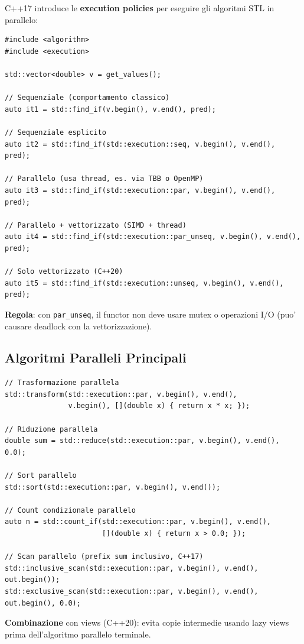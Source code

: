 \documentclass[11pt,a4paper]{article}
\theoremstyle{remark}
\begin{document}
C++17 introduce le \textbf{execution policies} per eseguire gli algoritmi STL in parallelo:

\begin{lstlisting}[style=cpp]
#include <algorithm>
#include <execution>

std::vector<double> v = get_values();

// Sequenziale (comportamento classico)
auto it1 = std::find_if(v.begin(), v.end(), pred);

// Sequenziale esplicito
auto it2 = std::find_if(std::execution::seq, v.begin(), v.end(), pred);

// Parallelo (usa thread, es. via TBB o OpenMP)
auto it3 = std::find_if(std::execution::par, v.begin(), v.end(), pred);

// Parallelo + vettorizzato (SIMD + thread)
auto it4 = std::find_if(std::execution::par_unseq, v.begin(), v.end(), pred);

// Solo vettorizzato (C++20)
auto it5 = std::find_if(std::execution::unseq, v.begin(), v.end(), pred);
\end{lstlisting}

\textbf{Regola}: con \lstinline|par_unseq|, il functor non deve usare mutex o operazioni I/O (puo' causare deadlock con la vettorizzazione).

\subsection{Algoritmi Paralleli Principali}

\begin{lstlisting}[style=cpp]
// Trasformazione parallela
std::transform(std::execution::par, v.begin(), v.end(),
               v.begin(), [](double x) { return x * x; });

// Riduzione parallela
double sum = std::reduce(std::execution::par, v.begin(), v.end(), 0.0);

// Sort parallelo
std::sort(std::execution::par, v.begin(), v.end());

// Count condizionale parallelo
auto n = std::count_if(std::execution::par, v.begin(), v.end(),
                       [](double x) { return x > 0.0; });

// Scan parallelo (prefix sum inclusivo, C++17)
std::inclusive_scan(std::execution::par, v.begin(), v.end(), out.begin());
std::exclusive_scan(std::execution::par, v.begin(), v.end(), out.begin(), 0.0);
\end{lstlisting}

\textbf{Combinazione} con views (C++20): evita copie intermedie usando lazy views prima dell'algoritmo parallelo terminale.
\end{document}
